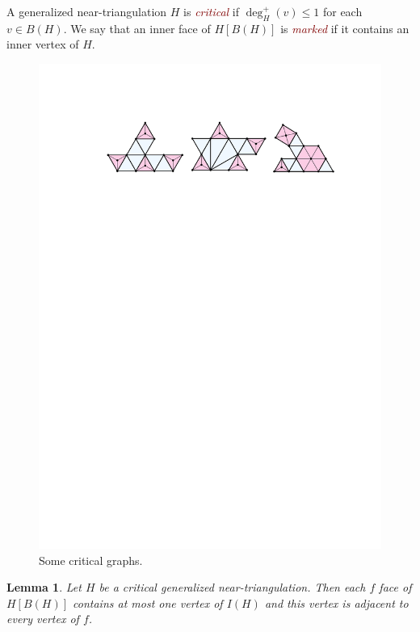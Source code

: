 \documentclass{article}
\newtheorem{lem}{Lemma}
\newcommand{\defin}[1]{\emph{\textcolor{Maroon}{#1}}}
\theoremstyle{definition}
\begin{document}
A generalized near-triangulation $H$ is \defin{critical} if $\deg^+_H(v)\le 1$ for each $v\in B(H)$. We say that an inner face of $H[B(H)]$ is \defin{marked} if it contains an inner vertex of $H$.

\begin{figure}[htbp]
    \centering
    \includegraphics[page=1]{figs/critical}
    \caption{Some critical graphs.}
    \label{critical_fig}
\end{figure}


\begin{lem}\label{critical_structure}
    Let $H$ be a critical generalized near-triangulation. Then each $f$ face of $H[B(H)]$ contains at most one vertex of $I(H)$ and this vertex is adjacent to every vertex of $f$.
\end{lem}
\end{document}
